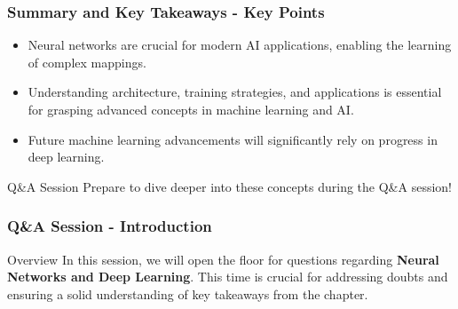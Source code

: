 \documentclass[aspectratio=169]{beamer}
\begin{document}
\begin{frame}[fragile]
  \frametitle{Summary and Key Takeaways - Key Points}
  \begin{itemize}
    \item Neural networks are crucial for modern AI applications, enabling the learning of complex mappings.
    \item Understanding architecture, training strategies, and applications is essential for grasping advanced concepts in machine learning and AI.
    \item Future machine learning advancements will significantly rely on progress in deep learning.
  \end{itemize}
  \begin{block}{Q\&A Session}
    Prepare to dive deeper into these concepts during the Q\&A session!
  \end{block}
\end{frame}

\begin{frame}[fragile]
  \frametitle{Q\&A Session - Introduction}
  \begin{block}{Overview}
    In this session, we will open the floor for questions regarding \textbf{Neural Networks and Deep Learning}. 
    This time is crucial for addressing doubts and ensuring a solid understanding of key takeaways from the chapter.
  \end{block}
\end{frame}
\end{document}
